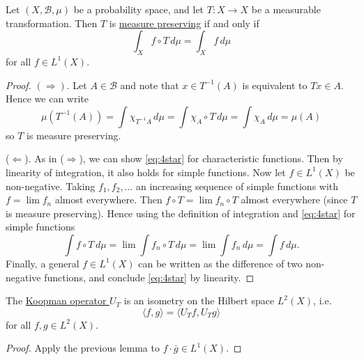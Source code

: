 \documentclass{article}
\begin{document}
\begin{lemma}
  Let $(X, \mathcal{B}, \mu)$ be a probability space, and let $T: X \to X$ be a measurable transformation.
  Then $T$ is \hyperlink{def:mps}{measure preserving} if and only if
  \begin{equation*}
    \int_X f \circ T \, d\mu = \int_X f \, d\mu \label{eq:4star} \tag{$*$}
  \end{equation*}
  for all $f \in L^1(X)$.
\end{lemma}
\begin{proof}
  $(\Rightarrow)$. Let $A \in \mathcal{B}$ and note that $x \in T^{-1}(A)$ is equivalent to $Tx \in A$.
  Hence we can write
  \begin{equation*}
    \mu(T^{-1}(A))=\int\!\chi_{T^{-1}A}\,d\mu=\int\!\chi_A\circ T\,d\mu=\int\!\chi_A\,d\mu=\mu(A)
  \end{equation*}
  so $T$ is measure preserving.

  ($\Leftarrow$). As in ($\Rightarrow$), we can show \eqref{eq:4star} for characteristic functions.
  Then by linearity of integration, it also holds for simple functions.
  Now let $f \in L^1(X)$ be non-negative. Taking $f_1, f_2, \dotsc$ an increasing sequence of simple functions with $f = \lim f_n$ almost everywhere.
  Then $f \circ T = \lim f_n \circ T$ almost everywhere (since $T$ is measure preserving).
  Hence using the definition of integration and \eqref{eq:4star} for simple functions
  \begin{equation*}
    \int\!f\circ T\,d\mu=\lim\int\!f_n\circ T\,d\mu=\lim\int\!f_n\,d\mu=\int\!f\,d\mu.
  \end{equation*}
  Finally, a general $f \in L^1(X)$ can be written as the difference of two non-negative functions, and conclude \eqref{eq:4star} by linearity.
\end{proof}
\begin{lemma}
  The \hyperlink{def:koopman}{Koopman operator $U_T$} is an isometry on the Hilbert space $L^2(X)$, i.e.
  \begin{equation*}
    \langle f, g \rangle = \langle U_T f, U_T g \rangle
  \end{equation*}
  for all $f,g \in L^2(X)$.
\end{lemma}
\begin{proof}
  Apply the previous lemma to $f \cdot \bar{g} \in L^1(X)$.
\end{proof}
\end{document}

